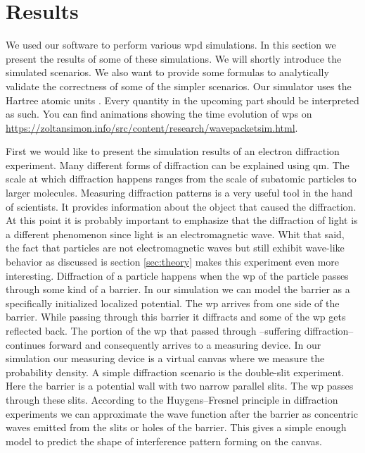 \section{Results}
\label{sec:results}

We used our software to perform various \acrshort{wpd} simulations.
In this section we present the results of some of these simulations.
We will shortly introduce the simulated scenarios.
We also want to provide some formulas to analytically validate the correctness of some of the simpler scenarios.
Our simulator uses the Hartree atomic units \cite{hartree_1928}.
Every quantity in the upcoming part should be interpreted as such.
You can find animations showing the time evolution of \acrshort{wp}s on  \url{https://zoltansimon.info/src/content/research/wavepacketsim.html}.

First we would like to present the simulation results of an electron diffraction experiment.
Many different forms of diffraction can be explained using \acrshort{qm}.
The scale at which diffraction happens ranges from the scale of subatomic particles  to larger molecules.
Measuring diffraction patterns is a very useful tool in the hand of scientists.
It provides information about the object that caused the diffraction.
At this point it is probably important to emphasize that the diffraction of light is a different phenomenon since light is an electromagnetic wave.
Whit that said, the fact that particles are not electromagnetic waves but still exhibit wave-like behavior as discussed is section \ref{sec:theory} makes this experiment even more interesting.
Diffraction of a particle happens when the \acrshort{wp} of the particle passes through some kind of a barrier.
In our simulation we can model the barrier as a specifically initialized localized potential.
The \acrshort{wp} arrives from one side of the barrier.
While passing through this barrier it diffracts and some of the \acrshort{wp} gets reflected back.
The portion of the \acrshort{wp} that passed through --suffering diffraction-- continues forward and consequently arrives to a measuring device.
In our simulation our measuring device is a virtual canvas where we measure the probability density.
A simple diffraction scenario is the double-slit experiment.
Here the barrier is a potential wall with two narrow parallel slits.
The \acrshort{wp} passes through these slits.
According to the Huygens–Fresnel principle in diffraction experiments we can approximate the wave function after the barrier as concentric waves emitted from the slits or holes of the barrier.
This gives a simple enough model to predict the shape of interference pattern forming on the canvas.
